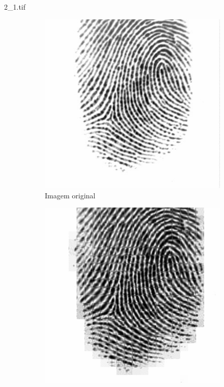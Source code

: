\documentclass{beamer}
\begin{document}
    \begin{frame}{2\_1.tif}
        \begin{figure}
            \centering
            \begin{subfigure}[!ht]{0.32\textwidth}
                \includegraphics[width=\columnwidth]{Fingerprints/2_1.jpg}
                \caption{Imagem original}
            \end{subfigure}
            \begin{subfigure}[!ht]{0.32\textwidth}
                \includegraphics[width=\columnwidth]{Fingerprints/2_1_intermediate.jpg}

\end{subfigure}
\end{figure}
\end{frame}
\end{document}
